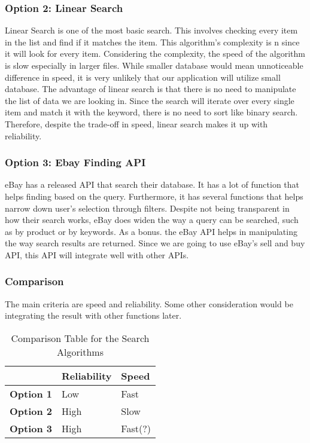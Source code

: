 \documentclass[journal,compsoc, 10pt, draftclsnofoot, onecolumn]{IEEEtran}
\begin{document}
\subsubsection*{Option 2: Linear Search}
Linear Search is one of the most basic search. This involves checking every item in
the list and find if it matches the item. This algorithm's complexity is n since it
will look for every item. Considering the complexity, the speed of the algorithm is
slow especially in larger files. While smaller database would mean unnoticeable
difference in speed, it is very unlikely that our application will utilize small
database. The advantage of linear search is that there is no need to manipulate the
list of data we are looking in. Since the search will iterate over every single item
and match it with the keyword, there is no need to sort like binary search.
Therefore, despite the trade-off in speed, linear search makes it up with
reliability.

\subsubsection*{Option 3: Ebay Finding API}
eBay has a released API that search their database. It has a lot of function that
helps finding based on the query. Furthermore, it has several functions that helps
narrow down user's selection through filters. Despite not being transparent in how
their search works, eBay does widen the way a query can be searched, such as by
product or by keywords. As a bonus. the eBay API helps in manipulating the way search
results are returned. Since we are going to use eBay's sell and buy API, this API
will integrate well with other APIs.

\subsubsection{Comparison}
The main criteria are speed and reliability. Some other consideration would be
integrating the result with other functions later.

\begin{table}[h]
	\centering
	\caption{Comparison Table for the Search Algorithms}
	\label{Comparison Table for the Search Algorithm}
	\begin{tabularx}{\textwidth}{|X|X|X|}
		\hline
		\textbf{}         & \textbf{Reliability}                & \textbf{Speed} 
		\\ \hline
		\textbf{Option 1} & Low & Fast
		\\ \hline
\textbf{Option 2} & High & Slow		\\ \hline
\textbf{Option 3} & High &Fast(?)		\\ \hline
	\end{tabularx}
\end{table}
\end{document}
